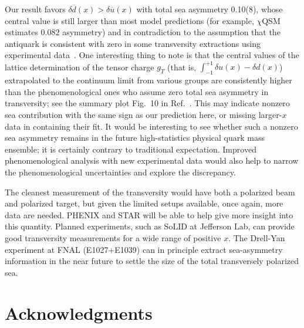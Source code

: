 Our result favors $\delta \overline{d}(x) > \delta \overline{u}(x)$ with total sea asymmetry
0.10(8), whose central value is still larger than most model predictions (for example, $\chi$QSM estimates $0.082$ asymmetry)
and in contradiction to the assumption that the antiquark is consistent with zero in some
transversity extractions using experimental data~\cite{Anselmino:2008jk,Radici:2013vra,Kang:2014zza,Kang:2015msa}. 
One interesting thing to note is that the central values of the lattice determination of the tensor charge $g_T$ (that is, $\int_{-1}^{+1} \delta u(x) -\delta d(x)$) extrapolated to the continuum limit from various groups are consistently higher than the phenomenological ones who assume zero total sea asymmetry in transversity; see the summary plot Fig.~10 in Ref.~\cite{Bhattacharya:2015wna}. This may indicate nonzero sea contribution with the same sign as our prediction here, or missing larger-$x$ data in containing their fit. 
It would be interesting to see whether such a nonzero sea asymmetry remains in the future high-statistics physical quark mass ensemble; it is certainly contrary to traditional expectation. Improved phenomenological analysis with new experimental data would also help to narrow the phenomenological uncertainties and explore the discrepancy.

The cleanest measurement of the transversity would have both a polarized beam and polarized target, but given the limited setups available, once again, more data are needed.
PHENIX and STAR will be able to help give more insight into this quantity.
Planned experiments, such as SoLID at Jefferson Lab, can provide good transversity measurements for a wide range of positive $x$.
The Drell-Yan experiment at FNAL (E1027+E1039) can in principle extract
sea-asymmetry information in the near future to settle the size of the total transversely polarized sea.

\section*{Acknowledgments}

